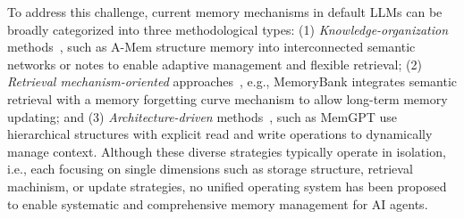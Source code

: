 \documentclass[11pt]{article}
\begin{document}

To address this challenge, current memory mechanisms in default LLMs can be broadly categorized into three methodological types:
(1) \emph{Knowledge-organization} methods~\cite{xu2025mem,liu2023think}, such as A-Mem structure memory into interconnected semantic networks or notes to enable adaptive management and flexible retrieval; (2) \emph{Retrieval mechanism-oriented} approaches~\cite{emotional,zhong2024memorybank,li2024hello}, e.g., MemoryBank integrates semantic retrieval with a memory forgetting curve mechanism to allow long-term memory updating; and (3) \emph{Architecture-driven} methods~\cite{packer2023memgpt,chhikara2025mem0}, such as MemGPT use hierarchical structures with explicit read and write operations to dynamically manage context.
Although these diverse strategies typically operate in isolation, i.e., each focusing on single dimensions such as storage structure, retrieval machinism, or update strategies, no unified operating system has been proposed to enable systematic and comprehensive memory management for AI agents.
\end{document}
